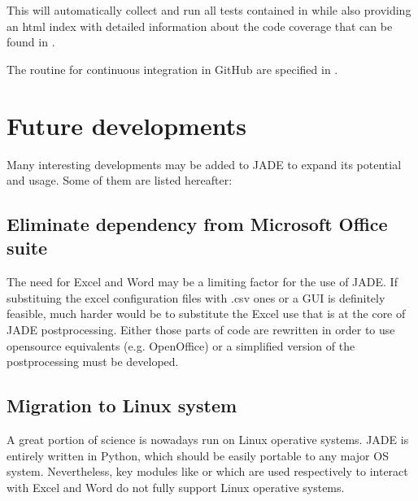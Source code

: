 \documentclass[letterpaper,10pt,english]{sphinxmanual}
\begin{document}
\sphinxAtStartPar
This will automatically collect and run all tests contained in
 while also providing an html index with detailed
information about the code coverage that can be found in
.

\sphinxAtStartPar
The routine for continuous integration in GitHub are specified in
.


\chapter{Future developments}
\label{\detokenize{futuredev:future-developments}}\label{\detokenize{futuredev::doc}}
\sphinxAtStartPar
Many interesting developments may be added to JADE to expand its potential and
usage. Some of them are listed hereafter:


\section{Eliminate dependency from Microsoft Office suite}
\label{\detokenize{futuredev:eliminate-dependency-from-microsoft-office-suite}}
\sphinxAtStartPar
The need for Excel and Word may be a limiting factor for the use of JADE.
If substituing the excel configuration files with .csv ones or a GUI is
definitely feasible, much harder would be to substitute the Excel use that is
at the core of JADE post\sphinxhyphen{}processing. Either those parts of code are rewritten
in order to use open\sphinxhyphen{}source equivalents (e.g. OpenOffice) or a simplified
version of the post\sphinxhyphen{}processing must be developed.


\section{Migration to Linux system}
\label{\detokenize{futuredev:migration-to-linux-system}}
\sphinxAtStartPar
A great portion of science is nowadays run on Linux operative systems.
JADE is entirely written in Python, which should be easily portable to any
major OS system. Nevertheless,
key modules like  or  which are used respectively
to interact with Excel and Word do not fully support Linux operative systems.
\end{document}
